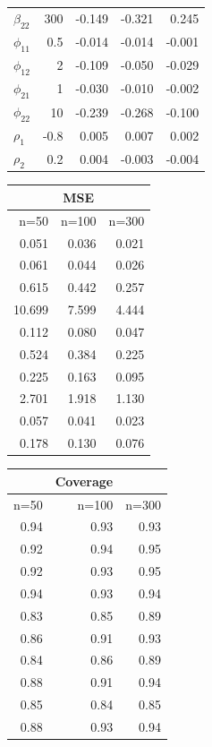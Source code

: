 \documentclass[useAMS,referee]{biom}
\begin{document}
\begin{table}[!h]
\begin{minipage}[b]{.43\textwidth}
\begin{tabular}{lrrrr}
	$\beta_{22}$&300&-0.149&	-0.321&	0.245\\
	$\phi_{11}$	&0.5& -0.014&	-0.014&	-0.001\\
	$\phi_{12}$&2&	-0.109&	-0.050&	-0.029\\
	$\phi_{21}$	&1&	-0.030&	-0.010&	-0.002\\
	$\phi_{22}$	&10&-0.239&	-0.268&	-0.100\\
	$\rho_1$ &-0.8	&0.005&	0.007&	0.002\\
	$\rho_2$&	0.2	&
	0.004&	-0.003&	-0.004\\
\end{tabular}
\end{minipage}
\begin{minipage}[b]{.28\textwidth} 		
\begin{tabular}{rrr} 
	& \multicolumn{1}{c}{MSE}  &\\ 
	\hline
	n=50 & n=100 & n=300   \\ 	
	\hline 
	0.051&	0.036&	0.021\\
	0.061&	0.044&	0.026\\
	0.615&	0.442&	0.257\\
	10.699&	7.599&	4.444\\
	0.112&	0.080&	0.047\\
	0.524&	0.384&	0.225\\
	0.225&	0.163&	0.095\\
	2.701&	1.918&	1.130\\
	0.057&	0.041&	0.023\\
	0.178&	0.130&	0.076\\ 	
\end{tabular}
\end{minipage}
\begin{minipage}[b]{.1\textwidth} 		
\begin{tabular}{rrr} 
	& \multicolumn{1}{c}{Coverage} &  \\ 
\hline
	n=50 & n=100 & n=300   \\ 	
	\midrule 
	0.94&	0.93&	0.93\\
	0.92&	0.94&	0.95\\
	0.92&	0.93&	0.95\\
	0.94&	0.93&	0.94\\
	0.83&	0.85&	0.89\\
	0.86&	0.91&	0.93\\
	0.84&	0.86&	0.89\\
	0.88&	0.91&	0.94\\
	0.85&	0.84&	0.85\\
	0.88&	0.93&	0.94\\	

\end{tabular}
\end{minipage}
\end{table}
\end{document}
